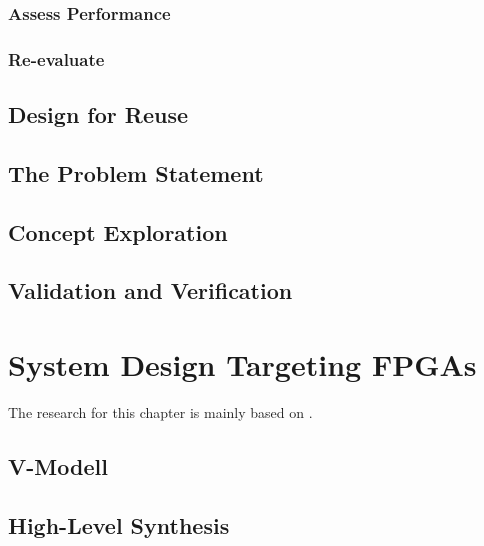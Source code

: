 \subsubsection{Assess Performance}

\subsubsection{Re-evaluate}


\subsection{Design for Reuse}

\subsection{The Problem Statement}

\subsection{Concept Exploration}

\subsection{Validation and Verification}

\section{System Design Targeting FPGAs}
The research for this chapter is mainly based on \cite{GesslerRalf2014EES}.

\subsection{V-Modell}



\subsection{High-Level Synthesis}


